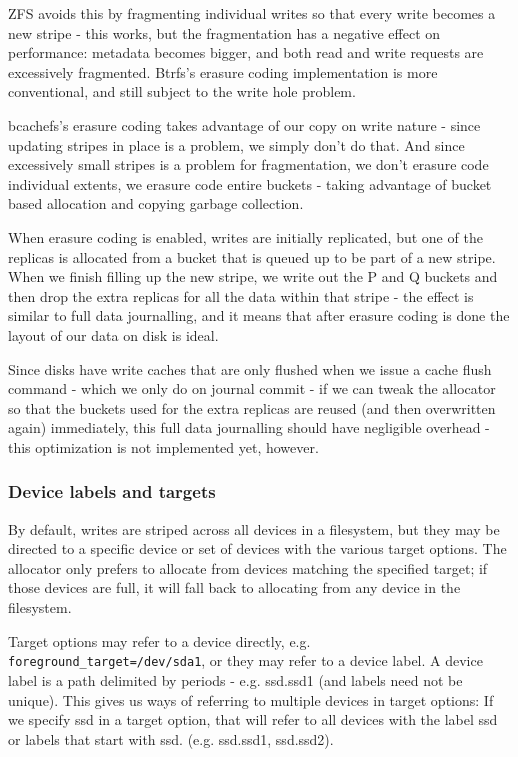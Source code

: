 \documentclass{article}
\begin{document}
ZFS avoids this by fragmenting individual writes so that every write becomes a
new stripe - this works, but the fragmentation has a negative effect on
performance: metadata becomes bigger, and both read and write requests are
excessively fragmented. Btrfs's erasure coding implementation is more
conventional, and still subject to the write hole problem.

bcachefs's erasure coding takes advantage of our copy on write nature - since
updating stripes in place is a problem, we simply don't do that. And since
excessively small stripes is a problem for fragmentation, we don't erasure code
individual extents, we erasure code entire buckets - taking advantage of bucket
based allocation and copying garbage collection.

When erasure coding is enabled, writes are initially replicated, but one of the
replicas is allocated from a bucket that is queued up to be part of a new
stripe. When we finish filling up the new stripe, we write out the P and Q
buckets and then drop the extra replicas for all the data within that stripe -
the effect is similar to full data journalling, and it means that after erasure
coding is done the layout of our data on disk is ideal.

Since disks have write caches that are only flushed when we issue a cache flush
command - which we only do on journal commit - if we can tweak the allocator so
that the buckets used for the extra replicas are reused (and then overwritten
again) immediately, this full data journalling should have negligible overhead -
this optimization is not implemented yet, however.

\subsubsection{Device labels and targets}

By default, writes are striped across all devices in a filesystem, but they may
be directed to a specific device or set of devices with the various target
options. The allocator only prefers to allocate from devices matching the
specified target; if those devices are full, it will fall back to allocating
from any device in the filesystem.

Target options may refer to a device directly, e.g.
\texttt{foreground\_target=/dev/sda1}, or they may refer to a device label. A
device label is a path delimited by periods - e.g. ssd.ssd1 (and labels need not
be unique). This gives us ways of referring to multiple devices in target
options: If we specify ssd in a target option, that will refer to all devices
with the label ssd or labels that start with ssd. (e.g. ssd.ssd1, ssd.ssd2).
\end{document}

